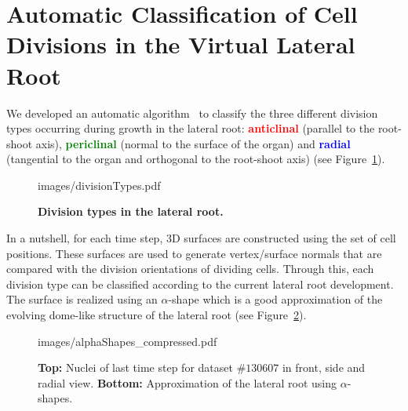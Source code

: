 \documentclass[11pt,a4paper, final]{article}
\begin{document}
\section{Automatic Classification of Cell Divisions in the Virtual Lateral Root}
\label{sec:divisionTypes}
\noindent
We developed an automatic algorithm~\cite[chapter 4]{FangerauDiss_2015} to classify the three different division types occurring during growth in the lateral root: \textcolor{red}{\textbf{anticlinal}} (parallel to the root-shoot axis), \textcolor{green}{\textbf{periclinal}} (normal to the surface of the organ) and \textcolor{blue}{\textbf{radial}} (tangential to the organ and orthogonal to the root-shoot axis) (see Figure~\ref{fig:divisionTypes}).
%
\begin{figure}[htbp]
	\begin{center}
		\begin{overpic}[width=0.8\linewidth]{images/divisionTypes.pdf}
		\end{overpic}
\caption[Division types in the lateral root.]
{
{\bf Division types in the lateral root.}
}
	\label{fig:divisionTypes}
	\end{center}
\end{figure}
%
In a nutshell, for each time step, 3D surfaces are constructed using the set of cell positions. These surfaces are used to generate vertex/surface normals that are compared with the division orientations of dividing cells. Through this, each division type can be classified according to the current lateral root development. The surface is realized using an $\alpha$-shape which is a good approximation of the evolving dome-like structure of the lateral root (see Figure~\ref{fig:alphaShapes}).
%
\begin{figure}[htbp]
	\begin{center}
		\begin{overpic}[width=1.\linewidth]{images/alphaShapes_compressed.pdf}
		\end{overpic}
\caption[Approximation of the lateral root using $\alpha$-shapes.]
{
{\bf Top:} Nuclei of last time step for dataset $\# 130607$ in front, side and radial view. {\bf Bottom:} Approximation of the lateral root using $\alpha$-shapes.
}
	\label{fig:alphaShapes}
	\end{center}
\end{figure}
%
\end{document}
